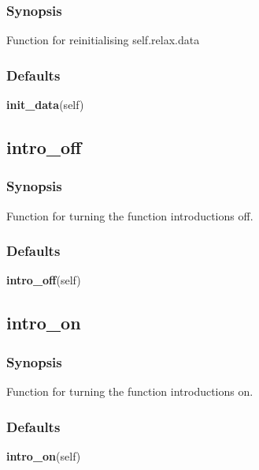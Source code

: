 \subsubsection{Synopsis}

Function for reinitialising self.relax.data



\subsubsection{Defaults}

\textsf{\textbf{init\_data}(self)}



\newpage

\subsection{intro\_off}


\subsubsection{Synopsis}

Function for turning the function introductions off.



\subsubsection{Defaults}

\textsf{\textbf{intro\_off}(self)}



\newpage

\subsection{intro\_on}


\subsubsection{Synopsis}

Function for turning the function introductions on.



\subsubsection{Defaults}

\textsf{\textbf{intro\_on}(self)}



